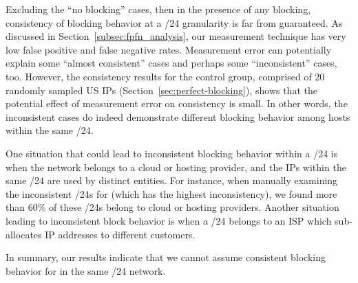Excluding the ``no blocking'' cases, then in the presence of any
blocking, consistency of blocking behavior at a /24 granularity is far
from guaranteed.  As discussed in Section~\ref{subsec:fpfn_analysis},
our measurement technique has very low false positive and false
negative rates.  Measurement error can potentially explain some
``almost consistent'' cases and perhaps some ``inconsistent'' cases,
too.  However, the consistency results for the control group,
comprised of 20 randomly sampled US IPs
(Section~\ref{sec:perfect-blocking}), shows that the potential effect
of measurement error on consistency is small.  In other words, the
inconsistent cases do indeed demonstrate different blocking behavior
among hosts within the same /24.

One situation that could lead to inconsistent blocking behavior within
a /24 is when the network belongs to a cloud or hosting provider, and
the IPs within the same /24 are used by distinct entities.  For
instance, when manually examining the inconsistent /24s for {\bdsatif}
(which has the highest inconsistency), we found more than 60\% of
these /24s belong to cloud or hosting providers.  Another situation
leading to inconsistent block behavior is when a /24 belongs to an ISP
which sub-allocates IP addresses to different customers.

In summary, our results indicate that we cannot assume consistent
blocking behavior for {} in the same /24 network.
